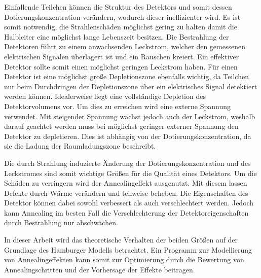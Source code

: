 Einfallende Teilchen können die
Struktur des Detektors und somit dessen Dotierungskonzentration verändern, wodurch dieser ineffizienter wird.
Es ist somit notwendig, die Strahlenschäden möglichst gering zu halten damit
die Halbleiter eine möglichst lange Lebenszeit besitzen.
Die Bestrahlung der Detektoren führt zu einem anwachsenden Leckstrom, welcher den
gemessenen elektrischen Signalen überlagert ist und ein Rauschen kreiert. Ein
effektiver Detektor sollte somit einen möglichst geringen Leckstrom haben.
Für einen Detektor ist eine möglichst große Depletionszone ebenfalls wichtig,
da Teilchen nur beim Durchdringen der Depletionszone über ein elektrisches Signal detektiert
werden können.
Idealerweise
liegt eine vollständige Depletion des Detektorvolumens vor. Um dies zu erreichen wird
eine externe Spannung verwendet. Mit steigender Spannung wächst jedoch auch der Leckstrom, weshalb
darauf geachtet werden muss bei möglichst geringer externer Spannung den Detektor zu depletieren.
Dies ist abhängig von der Dotierungskonzentration, da sie die Ladung der
Raumladungszone beschreibt.

Die durch Strahlung induzierte Änderung der Dotierungskonzentration und des Leckstromes sind
somit wichtige Größen für die Qualität eines Detektors.
Um die Schäden zu verringern wird der Annealingeffekt ausgenutzt. Mit diesem lassen
Defekte durch Wärme verändern und teilweise beheben. Die Eigenschaften des Detektor können
dabei sowohl verbessert als auch verschlechtert werden.
Jedoch kann Annealing im besten Fall die Verschlechterung der Detektoreigenschaften durch Bestrahlung nur
abschwächen.

In dieser Arbeit wird das
theoretische Verhalten der beiden Größen auf der Grundlage des Hamburger Modells betrachtet.
Ein Programm zur Modellierung von Annealingeffekten kann somit zur
Optimierung durch die Bewertung von Annealingschritten und der Vorhersage der Effekte beitragen.
